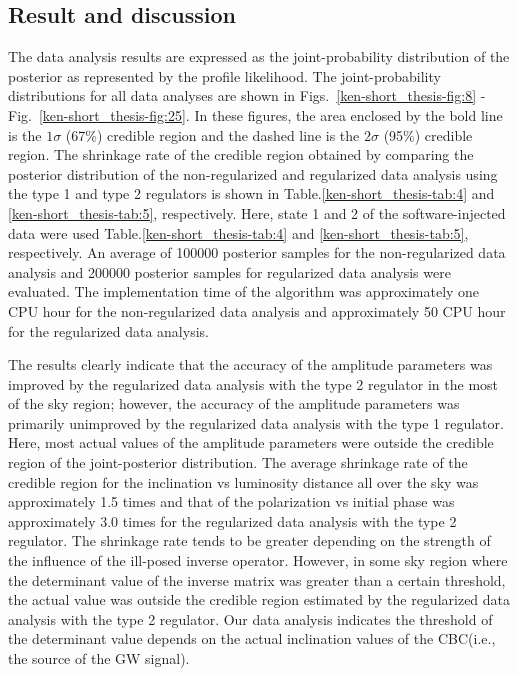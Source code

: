 \documentclass[%
 aps,
 prd,
 amsmath,amssymb,
 reprint,%
superscriptaddress
]{revtex4-1}
\begin{document}
\subsection{Result and discussion}\label{ken-short_thesis-sec:result}
The data analysis results are expressed as the joint-probability distribution of the posterior as represented by the profile likelihood. The joint-probability distributions for all data analyses are shown in Figs.~\ref{ken-short_thesis-fig:8} - Fig.~\ref{ken-short_thesis-fig:25}. In these figures, the area enclosed by the bold line is the
$1\sigma$ (67\%) credible region and the dashed line is the
$2\sigma$ (95\%) credible region. The shrinkage rate of the credible region obtained by comparing the posterior distribution of the non-regularized and regularized data analysis using the type 1 and type 2 regulators is shown in Table.\ref{ken-short_thesis-tab:4} and \ref{ken-short_thesis-tab:5}, respectively. Here, state 1 and 2 of the software-injected data were used Table.\ref{ken-short_thesis-tab:4} and \ref{ken-short_thesis-tab:5}, respectively. An average of 100000 posterior samples for the non-regularized data analysis and 200000 posterior samples for regularized data analysis were evaluated. The implementation time of the algorithm was approximately one CPU hour for the non-regularized data analysis and approximately 50 CPU hour for the regularized data analysis.

The results clearly indicate that the accuracy of the amplitude parameters was improved by the regularized data analysis with the type 2 regulator in the most of the sky region; however, the accuracy of the amplitude parameters was primarily unimproved by the regularized data analysis with the type 1 regulator. Here, most actual values of the amplitude parameters were outside the credible region of the joint-posterior distribution. The average shrinkage rate of the credible region for the inclination vs luminosity distance all over the sky was approximately 1.5 times and that of the polarization vs initial phase was approximately 3.0 times for the regularized data analysis with the type 2 regulator. The shrinkage rate tends to be greater depending on the strength of the influence of the ill-posed inverse operator. However, in some sky region where the determinant value of the inverse matrix was greater than a certain threshold, the actual value was outside the credible region estimated by the regularized data analysis with the type 2 regulator. Our data analysis indicates the threshold of the determinant value depends on the actual inclination values of the CBC(i.e., the source of the GW signal). 
\end{document}
